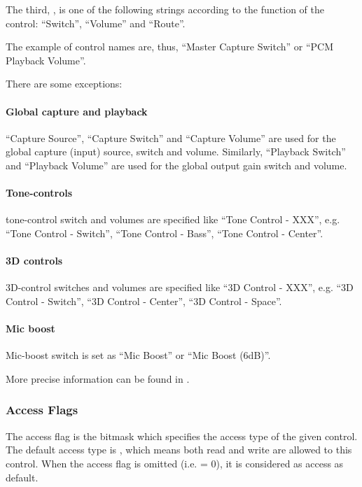 \documentclass[a4paper,8pt,english]{sphinxmanual}
\begin{document}
The third, , is one of the following strings according to
the function of the control: “Switch”, “Volume” and “Route”.

The example of control names are, thus, “Master Capture Switch” or “PCM
Playback Volume”.

There are some exceptions:


\paragraph{Global capture and playback}
\label{sound/kernel-api/writing-an-alsa-driver:global-capture-and-playback}
“Capture Source”, “Capture Switch” and “Capture Volume” are used for the
global capture (input) source, switch and volume. Similarly, “Playback
Switch” and “Playback Volume” are used for the global output gain switch
and volume.


\paragraph{Tone-controls}
\label{sound/kernel-api/writing-an-alsa-driver:tone-controls}
tone-control switch and volumes are specified like “Tone Control - XXX”,
e.g. “Tone Control - Switch”, “Tone Control - Bass”, “Tone Control -
Center”.


\paragraph{3D controls}
\label{sound/kernel-api/writing-an-alsa-driver:d-controls}
3D-control switches and volumes are specified like “3D Control - XXX”,
e.g. “3D Control - Switch”, “3D Control - Center”, “3D Control - Space”.


\paragraph{Mic boost}
\label{sound/kernel-api/writing-an-alsa-driver:mic-boost}
Mic-boost switch is set as “Mic Boost” or “Mic Boost (6dB)”.

More precise information can be found in
.


\subsubsection{Access Flags}
\label{sound/kernel-api/writing-an-alsa-driver:access-flags}
The access flag is the bitmask which specifies the access type of the
given control. The default access type is
, which means both read and write are
allowed to this control. When the access flag is omitted (i.e. = 0), it
is considered as  access as default.
\end{document}
